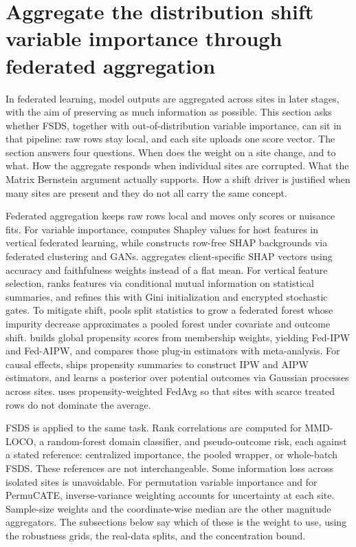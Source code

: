 \section{Aggregate the distribution shift variable importance through federated aggregation}
\label{sec:FedAGG_MetaLearner}

In federated learning, model outputs are aggregated across sites in later
stages, with the aim of preserving as much information as possible.
This section asks whether FSDS, together with out-of-distribution variable
importance, can sit in that pipeline: raw rows stay local, and each site
uploads one score vector.
The section answers four questions.
When does the weight on a site change, and to what.
How the aggregate responds when individual sites are corrupted.
What the Matrix Bernstein argument actually supports.
How a shift driver is justified when many sites are present and they do
not all carry the same concept.

Federated aggregation keeps raw rows local and moves only scores or
nuisance fits.
For variable importance, \cite{wang2019interpret} computes Shapley values
for host features in vertical federated learning, while
\cite{ducange2026fedshap} constructs row-free SHAP backgrounds via
federated clustering and GANs.
\cite{bonsignori2026iflash} aggregates client-specific SHAP vectors using
accuracy and faithfulness weights instead of a flat mean.
For vertical feature selection, \cite{fu2023feast} ranks features via
conditional mutual information on statistical summaries, and
\cite{li2023fedsdg} refines this with Gini initialization and encrypted
stochastic gates.
To mitigate shift, \cite{khellaf2026fedforest} pools split statistics to
grow a federated forest whose impurity decrease approximates a pooled
forest under covariate and outcome shift.
\cite{khellaf2025federated} builds global propensity scores from membership
weights, yielding Fed-IPW and Fed-AIPW, and compares those plug-in
estimators with meta-analysis.
For causal effects, \cite{xiong2023federated} ships propensity summaries to
construct IPW and AIPW estimators, and \cite{vo2022bayesian} learns a
posterior over potential outcomes via Gaussian processes across sites.
\cite{almodovar2024pwfedavg} uses propensity-weighted FedAvg so that sites
with scarce treated rows do not dominate the average.

FSDS is applied to the same task.
Rank correlations are computed for MMD-LOCO, a random-forest domain
classifier, and pseudo-outcome risk, each against a stated reference:
centralized importance, the pooled wrapper, or whole-batch FSDS.
These references are not interchangeable.
Some information loss across isolated sites is unavoidable.
For permutation variable importance and for PermuCATE, inverse-variance
weighting accounts for uncertainty at each site.
Sample-size weights and the coordinate-wise median are the other
magnitude aggregators.
The subsections below say which of these is the weight to use, using the
robustness grids, the real-data splits, and the concentration bound.

